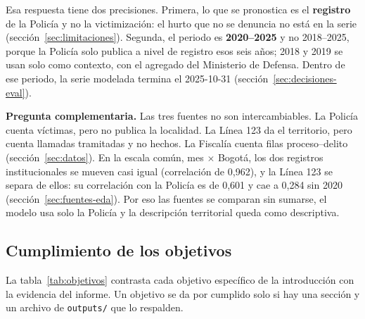 Esa respuesta tiene dos precisiones. Primera, lo que se pronostica es el \textbf{registro} de la Policía y no la victimización: el hurto que no se denuncia no está en la serie (sección~\ref{sec:limitaciones}). Segunda, el periodo es \textbf{2020--2025} y no 2018--2025, porque la Policía solo publica a nivel de registro esos seis años; 2018 y 2019 se usan solo como contexto, con el agregado del Ministerio de Defensa. Dentro de ese periodo, la serie modelada termina el 2025-10-31 (sección~\ref{sec:decisiones-eval}).

\textbf{Pregunta complementaria.} Las tres fuentes no son intercambiables. La Policía cuenta víctimas, pero no publica la localidad. La Línea 123 da el territorio, pero cuenta llamadas tramitadas y no hechos. La Fiscalía cuenta filas proceso--delito (sección~\ref{sec:datos}). En la escala común, mes $\times$ Bogotá, los dos registros institucionales se mueven casi igual (correlación de 0,962), y la Línea 123 se separa de ellos: su correlación con la Policía es de 0,601 y cae a 0,284 sin 2020 (sección~\ref{sec:fuentes-eda}). Por eso las fuentes se comparan sin sumarse, el modelo usa solo la Policía y la descripción territorial queda como descriptiva.

\subsection{Cumplimiento de los objetivos}\label{sec:objetivos-cumplimiento}

La tabla~\ref{tab:objetivos} contrasta cada objetivo específico de la introducción con la evidencia del informe. Un objetivo se da por cumplido solo si hay una sección y un archivo de \texttt{outputs/} que lo respalden.

